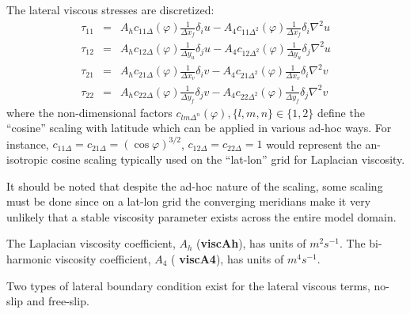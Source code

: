 The lateral viscous stresses are discretized:
\begin{eqnarray}
\tau_{11} & = & A_h c_{11\Delta}(\varphi) \frac{1}{\Delta x_f} \delta_i u
               -A_4 c_{11\Delta^2}(\varphi) \frac{1}{\Delta x_f} \delta_i \nabla^2 u \\
\tau_{12} & = & A_h c_{12\Delta}(\varphi) \frac{1}{\Delta y_u} \delta_j u
               -A_4 c_{12\Delta^2}(\varphi)\frac{1}{\Delta y_u} \delta_j \nabla^2 u \\
\tau_{21} & = & A_h c_{21\Delta}(\varphi) \frac{1}{\Delta x_v} \delta_i v
               -A_4 c_{21\Delta^2}(\varphi) \frac{1}{\Delta x_v} \delta_i \nabla^2 v \\
\tau_{22} & = & A_h c_{22\Delta}(\varphi) \frac{1}{\Delta y_f} \delta_j v
               -A_4 c_{22\Delta^2}(\varphi) \frac{1}{\Delta y_f} \delta_j \nabla^2 v
\end{eqnarray}
where the non-dimensional factors $c_{lm\Delta^n}(\varphi), \{l,m,n\} \in
\{1,2\}$ define the ``cosine'' scaling with latitude which can be
applied in various ad-hoc ways. For instance, $c_{11\Delta} =
c_{21\Delta} = (\cos{\varphi})^{3/2}$, $c_{12\Delta}=c_{22\Delta}=1$ would
represent the an-isotropic cosine scaling typically used on the
``lat-lon'' grid for Laplacian viscosity.

It should be noted that despite the ad-hoc nature of the scaling, some
scaling must be done since on a lat-lon grid the converging meridians
make it very unlikely that a stable viscosity parameter exists across
the entire model domain.

The Laplacian viscosity coefficient, $A_h$ ({\bf viscAh}), has units
of $m^2 s^{-1}$. The bi-harmonic viscosity coefficient, $A_4$ ({\bf
viscA4}), has units of $m^4 s^{-1}$.


Two types of lateral boundary condition exist for the lateral viscous
terms, no-slip and free-slip.

